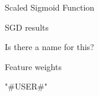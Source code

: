 \documentclass[12pt]{presentation}
\newcommand{\weights}{\mathbf{w}}
\newcommand{\X}{\mathbf{X}}
\begin{document}
\begin{frame}{Scaled Sigmoid Function}

\begin{center}
\end{center}
\end{frame}
\begin{frame}{SGD results}




	Is there a name for this?
\end{frame}

\begin{frame}{Feature weights}
\item["#USER#"]
\end{frame}
\end{document}

